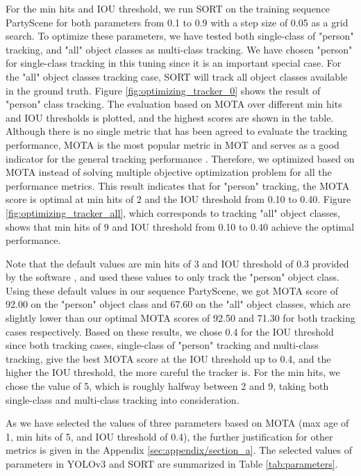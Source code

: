 For the min hits and IOU threshold, we run SORT on the training sequence PartyScene for both parameters from 0.1 to 0.9 with a step size of 0.05 as a grid search. To optimize these parameters, we have tested both single-class of "person" tracking, and "all" object classes as multi-class tracking. We have chosen "person" for single-class tracking in this tuning since it is an important special case. For the "all" object classes tracking case, SORT will track all object classes available in the ground truth. Figure \ref{fig:optimizing_tracker_0} shows the result of "person" class tracking. The evaluation based on MOTA over different min hits and IOU thresholds is plotted, and the highest scores are shown in the table. Although there is no single metric that has been agreed to evaluate the tracking performance, MOTA is the most popular metric in MOT and serves as a good indicator for the general tracking performance \cite{milan_mot16_2016} \cite{bernardin_evaluating_2008}. Therefore, we optimized based on MOTA instead of solving multiple objective optimization problem for all the performance metrics. This result indicates that for "person" tracking, the MOTA score is optimal at min hits of 2 and the IOU threshold from 0.10 to 0.40. Figure \ref{fig:optimizing_tracker_all}, which corresponds to tracking "all" object classes, shows that min hits of 9 and IOU threshold from 0.10 to 0.40 achieve the optimal performance.

Note that the default values are min hits of 3 and IOU threshold of 0.3 provided by the software \cite{abewley_abewleysort_2021}, and \citeauthor{bewley_simple_2016} \cite{bewley_simple_2016} used these values to only track the "person" object class. Using these default values in our sequence PartyScene, we got MOTA score of 92.00 on the "person" object class and 67.60 on the "all" object classes, which are slightly lower than our optimal MOTA scores of 92.50 and 71.30 for both tracking cases respectively. Based on these results, we chose 0.4 for the IOU threshold since both tracking cases, single-class of "person" tracking and multi-class tracking, give the best MOTA score at the IOU threshold up to 0.4, and the higher the IOU threshold, the more careful the tracker is. For the min hits, we chose the value of 5, which is roughly halfway between 2 and 9, taking both single-class and multi-class tracking into consideration.

As we have selected the values of three parameters based on MOTA (max age of 1, min hits of 5, and IOU threshold of 0.4), the further justification for other metrics is given in the Appendix \ref{sec:appendix/section_a}. The selected values of parameters in YOLOv3 and SORT are summarized in Table \ref{tab:parameters}.
